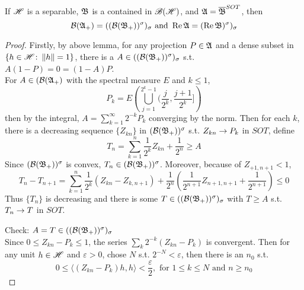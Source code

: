 \begin{thm}
	If $\mathscr{H}$ is a separable,  $\mathfrak{B}$ is a \Cs contained in $\mathscr{B(H)}$, and $\mathfrak{A} = \overline{\mathfrak{B}}^{SOT}$, then
	\begin{equation*}
		\mathcal{B}(\mathfrak{A}_+) = ((\mathcal{B}(\mathfrak{B}_+))^{\sigma})_{\sigma} \text{ and } \operatorname{Re}{\mathfrak{A}} = (\operatorname{Re}{\mathfrak{B}})^{\sigma})_{\sigma}
	\end{equation*}
\end{thm}
\begin{proof}
	Firstly, by above lemma, for any projection $P \in \mathfrak{A}$ and a dense subset in $\{h \in \mathscr{H} \colon \left\lVert h\right\lVert =1\}$, there is a $A \in ((\mathcal{B}(\mathfrak{B}_+))^{\sigma})_{\sigma}$ s.t. $A(1-P) = 0  = (1-A)P$.\\
	For $A \in (\mathcal{B}(\mathfrak{A}_+)$ with the spectral measure $E$ and $k \leqslant 1$,
	\begin{equation*}
		P_k = E \left(\bigcup_{j=1}^{2^k-1}(\frac{j}{2^k}, \frac{j+1}{2^k}] \right)
	\end{equation*}
	then by the integral, $A  =  \sum_{k=1}^{\infty}  2^{-k}P_k$ converging by the norm. Then for each $k$, there is a decreasing sequence $\{Z_{kn}\}$ in $(\mathcal{B}(\mathfrak{B}_+))^{\sigma}$ s.t. $Z_{kn} \rightarrow  P_k$ in $SOT$, define
	\begin{equation*}
		T_n = \sum_{k=1}^n \frac{1}{2^k} Z_{kn} + \frac{1}{2^n} \geqslant A
	\end{equation*}
	Since $(\mathcal{B}(\mathfrak{B}_+))^{\sigma}$ is convex, $T_n \in (\mathcal{B}(\mathfrak{B}_+))^{\sigma}$. Moreover, because of $Z_{+1,n+1} < 1$,
	\begin{equation*}
		T_{n} - T_{n+1}  = \sum_{k=1}^n \frac{1}{2^k} (Z_{kn} -  Z_{k,n+1}) + \frac{1}{2^n} (\frac{1}{2^{n+1}}Z_{n+1,n+1} + \frac{1}{2^{n+1}}) \leqslant 0
	\end{equation*}
	Thus $\{T_n\}$ is decreasing and there is some $T \in ((\mathcal{B}(\mathfrak{B}_+))^{\sigma})_{\sigma}$ with $T \geqslant A$ s.t. $T_n \rightarrow T$ in $SOT$.
	\item Check: $A = T \in ((\mathcal{B}(\mathfrak{B}_+))^{\sigma})_{\sigma}$ \\
	Since $0 \leqslant Z_{kn} - P_k \leqslant 1$, the series $\sum_k 2^{-k}(Z_{kn}-P_k)$ is convergent. Then for any unit $h \in \mathscr{H}$ and $\varepsilon > 0$, chose $N$ s.t. $2^{-N} < \varepsilon$, then there is an $n_0$ s.t. 
	\begin{equation*}
		0 \leqslant \langle (Z_{kn}-P_k) h,h \rangle < \frac{\varepsilon}{2}, \text{ for } 1 \leqslant k \leqslant N \text{ and } n \geqslant n_0
	\end{equation*}

\end{proof}
